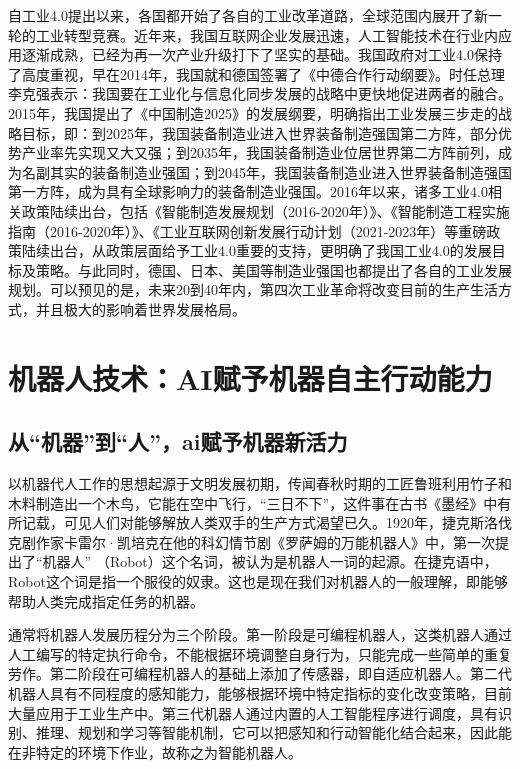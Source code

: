 自工业4.0提出以来，各国都开始了各自的工业改革道路，全球范围内展开了新一轮的工业转型竞赛。近年来，我国互联网企业发展迅速，人工智能技术在行业内应用逐渐成熟，已经为再一次产业升级打下了坚实的基础。我国政府对工业4.0保持了高度重视，早在2014年，我国就和德国签署了《中德合作行动纲要》。时任总理李克强表示：我国要在工业化与信息化同步发展的战略中更快地促进两者的融合。2015年，我国提出了《中国制造2025》的发展纲要，明确指出工业发展三步走的战略目标，即：到2025年，我国装备制造业进入世界装备制造强国第二方阵，部分优势产业率先实现又大又强；到2035年，我国装备制造业位居世界第二方阵前列，成为名副其实的装备制造业强国；到2045年，我国装备制造业进入世界装备制造强国第一方阵，成为具有全球影响力的装备制造业强国。2016年以来，诸多工业4.0相关政策陆续出台，包括《智能制造发展规划（2016-2020年）》、《智能制造工程实施指南（2016-2020年）》、《工业互联网创新发展行动计划（2021-2023年）等重磅政策陆续出台，从政策层面给予工业4.0重要的支持，更明确了我国工业4.0的发展目标及策略。与此同时，德国、日本、美国等制造业强国也都提出了各自的工业发展规划。可以预见的是，未来20到40年内，第四次工业革命将改变目前的生产生活方式，并且极大的影响着世界发展格局。

\section{机器人技术：AI赋予机器自主行动能力}
\subsection{从“机器”到“人”，ai赋予机器新活力}

以机器代人工作的思想起源于文明发展初期，传闻春秋时期的工匠鲁班利用竹子和木料制造出一个木鸟，它能在空中飞行，“三日不下”，这件事在古书《墨经》中有所记载，可见人们对能够解放人类双手的生产方式渴望已久。1920年，捷克斯洛伐克剧作家卡雷尔·凯培克在他的科幻情节剧《罗萨姆的万能机器人》中，第一次提出了“机器人” （Robot）这个名词，被认为是机器人一词的起源。在捷克语中，Robot这个词是指一个服役的奴隶。这也是现在我们对机器人的一般理解，即能够帮助人类完成指定任务的机器。

通常将机器人发展历程分为三个阶段。第一阶段是可编程机器人，这类机器人通过人工编写的特定执行命令，不能根据环境调整自身行为，只能完成一些简单的重复劳作。第二阶段在可编程机器人的基础上添加了传感器，即自适应机器人。第二代机器人具有不同程度的感知能力，能够根据环境中特定指标的变化改变策略，目前大量应用于工业生产中。第三代机器人通过内置的人工智能程序进行调度，具有识别、推理、规划和学习等智能机制，它可以把感知和行动智能化结合起来，因此能在非特定的环境下作业，故称之为智能机器人。

